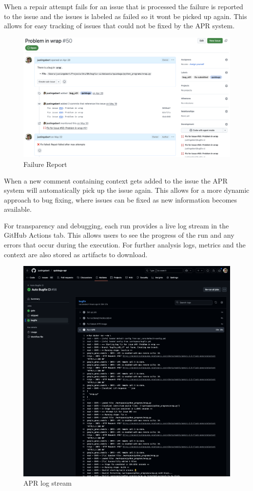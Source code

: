 When a repair attempt fails for an issue that is processed the failure is reported to the issue and the issues is labeled as failed so it wont be picked up again. This allows for easy tracking of issues that could not be fixed by the APR system.
\begin{figure}[H]
    \centering
    \includegraphics[width=1\textwidth]{images/workflow/issue comment.png}
    \caption{Failure Report}
    \label{fig:failure-report}
\end{figure}

When a new comment containing context gets added to the issue the APR system will automatically pick up the issue again. This allows for a more dynamic approach to bug fixing, where issues can be fixed as new information becomes available.

For transparency and debugging, each run provides a live log stream in the GitHub Actions tab. This allows users to see the progress of the run and any errors that occur during the execution. For further analysis logs, metrics and the context are also stored as artifacts to download.
\begin{figure}[H]
    \centering
    \includegraphics[width=1\textwidth]{images/workflow/logs.png}
    \caption{APR log stream}
    \label{fig:log-stream}
\end{figure}

